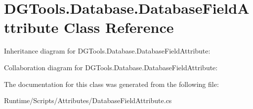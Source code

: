 \hypertarget{class_d_g_tools_1_1_database_1_1_database_field_attribute}{}\section{D\+G\+Tools.\+Database.\+Database\+Field\+Attribute Class Reference}
\label{class_d_g_tools_1_1_database_1_1_database_field_attribute}


Inheritance diagram for D\+G\+Tools.\+Database.\+Database\+Field\+Attribute\+:


Collaboration diagram for D\+G\+Tools.\+Database.\+Database\+Field\+Attribute\+:


The documentation for this class was generated from the following file\+:\begin{DoxyCompactItemize}
\item 
Runtime/\+Scripts/\+Attributes/Database\+Field\+Attribute.\+cs\end{DoxyCompactItemize}
